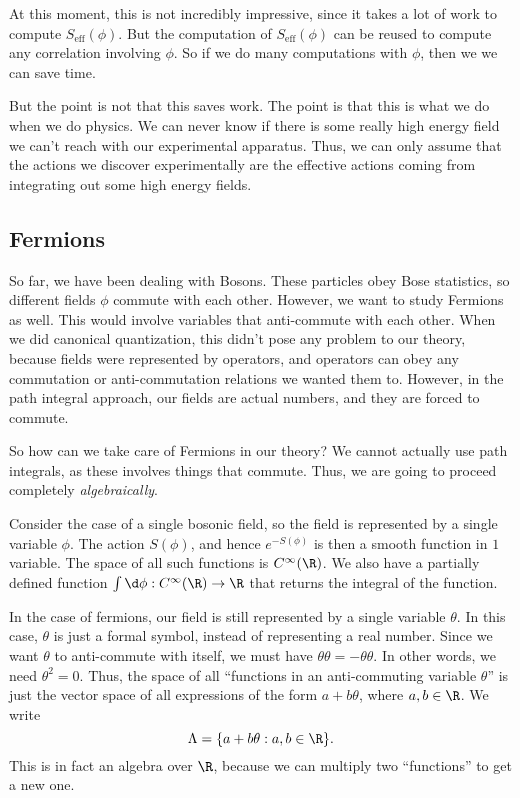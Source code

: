 \documentclass[a4paper]{article}
\begin{document}
At this moment, this is not incredibly impressive, since it takes a lot of work to compute $S_{\mathrm{eff}}(\phi)$. But the computation of $S_{\mathrm{eff}}(\phi)$ can be reused to compute any correlation involving $\phi$. So if we do many computations with $\phi$, then we we can save time.

But the point is not that this saves work. The point is that this is what we do when we do physics. We can never know if there is some really high energy field we can't reach with our experimental apparatus. Thus, we can only assume that the actions we discover experimentally are the effective actions coming from integrating out some high energy fields.

\subsection{Fermions}
So far, we have been dealing with Bosons. These particles obey Bose statistics, so different fields $\phi$ commute with each other. However, we want to study Fermions as well. This would involve variables that anti-commute with each other. When we did canonical quantization, this didn't pose any problem to our theory, because fields were represented by operators, and operators can obey any commutation or anti-commutation relations we wanted them to. However, in the path integral approach, our fields are actual numbers, and they are forced to commute.

So how can we take care of Fermions in our theory? We cannot actually use path integrals, as these involves things that commute. Thus, we are going to proceed completely \emph{algebraically}.

Consider the case of a single bosonic field, so the field is represented by a single variable $\phi$. The action $S(\phi)$, and hence $e^{-S(\phi)}$ is then a smooth function in $1$ variable. The space of all such functions is $C^\infty(\R)$. We also have a partially defined function $\int\d \phi: C^\infty(\R) \to \R$ that returns the integral of the function.

In the case of fermions, our field is still represented by a single variable $\theta$. In this case, $\theta$ is just a formal symbol, instead of representing a real number. Since we want $\theta$ to anti-commute with itself, we must have $\theta \theta = - \theta \theta$. In other words, we need $\theta^2 = 0$. Thus, the space of all ``functions in an anti-commuting variable $\theta$'' is just the vector space of all expressions of the form $a + b \theta$, where $a, b \in \R$. We write
\[
  \Lambda = \{a + b \theta: a, b \in \R\}.
\]
This is in fact an algebra over $\R$, because we can multiply two ``functions'' to get a new one.
\end{document}
